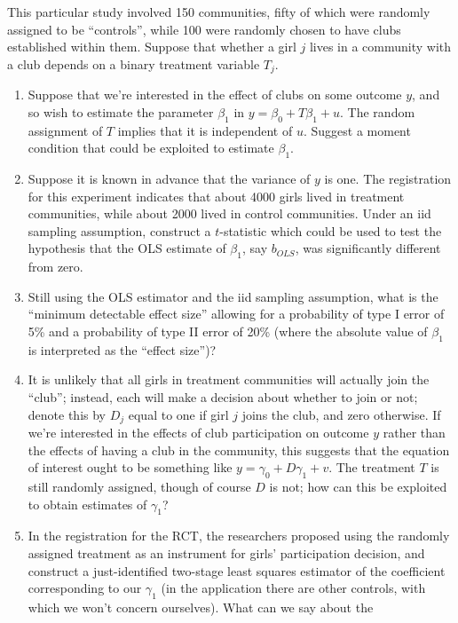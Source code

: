 \documentclass[12pt]{amsart}
\begin{document}
This particular study involved 150 communities, fifty of
which were randomly assigned to be ``controls'', while 100 were randomly
chosen to have clubs established within them.  Suppose that whether
a girl \(j\) lives in a community with a club depends on a binary
treatment variable \(T_j\).

\begin{enumerate}
\item Suppose that we're interested in the effect of clubs on some
outcome \(y\), and so wish to estimate the parameter \(\beta_1\) in
\(y = \beta_0 + T\beta_1 + u\).  The random assignment of \(T\)
implies that it is independent of \(u\).  Suggest a moment
condition that could be exploited to estimate \(\beta_1\).
\item Suppose it is known in advance that the variance of \(y\) is
one.  The registration for this experiment indicates
that about 4000 girls lived in treatment communities, while about
2000 lived in control communities.  Under an iid sampling
assumption, construct a \(t\)-statistic which could be used to
test the hypothesis that the OLS estimate of \(\beta_1\), say
\(b_{OLS}\), was significantly different from zero.
\item Still using the OLS estimator and the iid sampling assumption,
what is the ``minimum detectable effect size'' allowing for a
probability of type I error of 5\% and a probability of type II
error of 20\% (where the absolute value of \(\beta_1\) is
interpreted as the ``effect size'')?
\item It is unlikely that all girls in treatment communities will
actually join the ``club''; instead, each will make a decision
about whether to join or not; denote this by \(D_j\) equal to one
if girl \(j\) joins the club, and zero otherwise.  If we're
interested in the effects of club participation on outcome \(y\) rather than the
effects of having a club in the community, this suggests that the
equation of interest ought to be something like \(y=\gamma_0 +
     D\gamma_1 + v\).  The treatment \(T\) is still randomly assigned,
though of course \(D\) is not; how can this be exploited to obtain
estimates of \(\gamma_1\)?
\item In the registration for the RCT, the researchers proposed using
the randomly assigned treatment as an instrument for girls'
participation decision, and construct a just-identified two-stage
least squares estimator of the coefficient corresponding to our
\(\gamma_1\) (in the application there are other controls, with
which we won't concern ourselves).  What can we say about the

\end{enumerate}
\end{document}
